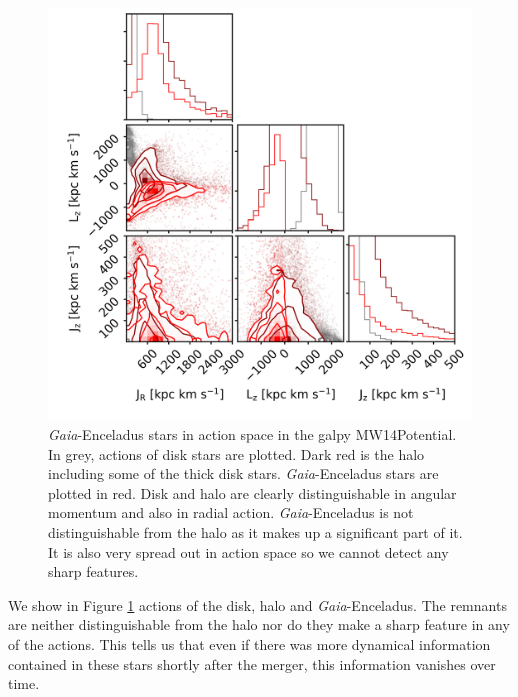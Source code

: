 \begin{figure}[htbp]
    \centering
    \includegraphics[width=1.0\textwidth]{plots/Discussion/Gaia_all_actions_MW14_talk3.png}
    \caption{\textit{Gaia}-Enceladus stars in action space in the galpy MW14Potential. In grey, actions of disk stars are plotted. Dark red is the halo including some of the thick disk stars. \textit{Gaia}-Enceladus stars are plotted in red. Disk and halo are clearly distinguishable in angular momentum and also in radial action. \textit{Gaia}-Enceladus is not distinguishable from the halo as it makes up a significant part of it. It is also very spread out in action space so we cannot detect any sharp features.}
    \label{fig:Gaia_Enceladus_actions}
\end{figure}
We show in Figure \ref{fig:Gaia_Enceladus_actions} actions of the disk, halo and \textit{Gaia}-Enceladus. The remnants are neither distinguishable from the halo nor do they make a sharp feature in any of the actions. This tells us that even if there was more dynamical information contained in these stars shortly after the merger, this information vanishes over time.


